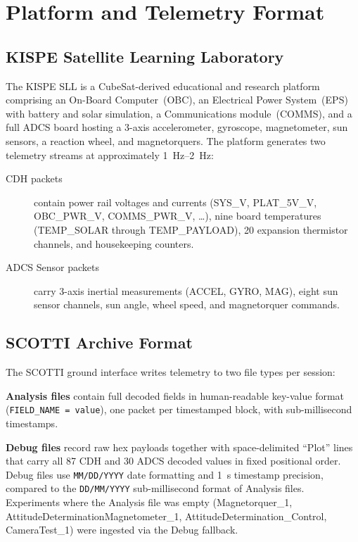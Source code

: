\documentclass[conference]{IEEEtran}
\begin{document}
\section{Platform and Telemetry Format}
\label{sec:platform}

\subsection{KISPE Satellite Learning Laboratory}

The KISPE SLL is a CubeSat-derived educational and research platform
comprising an On-Board Computer~(OBC), an Electrical Power System~(EPS)
with battery and solar simulation, a Communications module~(COMMS), and
a full ADCS board hosting a 3-axis accelerometer, gyroscope,
magnetometer, sun sensors, a reaction wheel, and magnetorquers.
The platform generates two telemetry streams at approximately
\SI{1}{\hertz}--\SI{2}{\hertz}:

\begin{description}
  \item[CDH packets] contain power rail voltages and currents
        (SYS\_V, PLAT\_5V\_V, OBC\_PWR\_V, COMMS\_PWR\_V, \ldots),
        nine board temperatures (TEMP\_SOLAR through TEMP\_PAYLOAD),
        20 expansion thermistor channels, and housekeeping counters.
  \item[ADCS Sensor packets] carry 3-axis inertial measurements
        (ACCEL, GYRO, MAG), eight sun sensor channels, sun angle,
        wheel speed, and magnetorquer commands.
\end{description}

\subsection{SCOTTI Archive Format}

The SCOTTI ground interface writes telemetry to two file types per
session:

\textbf{Analysis files} contain full decoded fields in human-readable
key-value format (\texttt{FIELD\_NAME = value}), one packet per
timestamped block, with sub-millisecond timestamps.

\textbf{Debug files} record raw hex payloads together with
space-delimited ``Plot'' lines that carry all 87 CDH and 30 ADCS
decoded values in fixed positional order.  Debug files use
\texttt{MM/DD/YYYY} date formatting and \SI{1}{\second} timestamp
precision, compared to the \texttt{DD/MM/YYYY} sub-millisecond format
of Analysis files.  Experiments where the Analysis file was empty
(Magnetorquer\_1, AttitudeDeterminationMagnetometer\_1,
AttitudeDetermination\_Control, CameraTest\_1) were ingested via the
Debug fallback.
\end{document}
